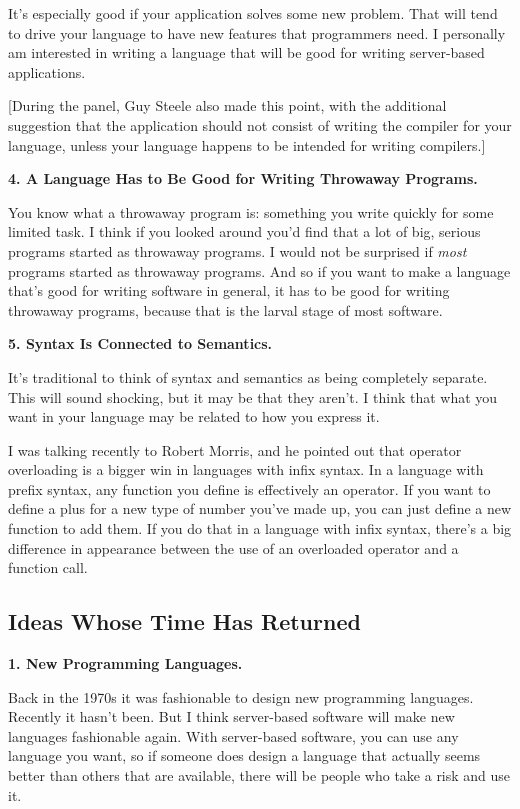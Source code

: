 \documentclass[12pt]{book}
\begin{document}
It's especially good if your application solves some new problem. That
will tend to drive your language to have new features that programmers
need. I personally am interested in writing a language that will be good
for writing server-based applications.

{[}During the panel, Guy Steele also made this point, with the
additional suggestion that the application should not consist of writing
the compiler for your language, unless your language happens to be
intended for writing compilers.{]}

\textbf{4. A Language Has to Be Good for Writing Throwaway Programs.}

You know what a throwaway program is: something you write quickly for
some limited task. I think if you looked around you'd find that a lot of
big, serious programs started as throwaway programs. I would not be
surprised if \emph{most} programs started as throwaway programs. And so
if you want to make a language that's good for writing software in
general, it has to be good for writing throwaway programs, because that
is the larval stage of most software.

\textbf{5. Syntax Is Connected to Semantics.}

It's traditional to think of syntax and semantics as being completely
separate. This will sound shocking, but it may be that they aren't. I
think that what you want in your language may be related to how you
express it.

I was talking recently to Robert Morris, and he pointed out that
operator overloading is a bigger win in languages with infix syntax. In
a language with prefix syntax, any function you define is effectively an
operator. If you want to define a plus for a new type of number you've
made up, you can just define a new function to add them. If you do that
in a language with infix syntax, there's a big difference in appearance
between the use of an overloaded operator and a function call.

\subsection{Ideas Whose Time Has
Returned}\label{ideas-whose-time-has-returned}

\textbf{1. New Programming Languages.}

Back in the 1970s it was fashionable to design new programming
languages. Recently it hasn't been. But I think server-based software
will make new languages fashionable again. With server-based software,
you can use any language you want, so if someone does design a language
that actually seems better than others that are available, there will be
people who take a risk and use it.
\end{document}
